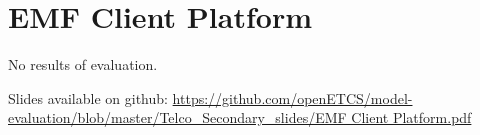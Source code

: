 \chapter{EMF Client Platform}
\label{sec:emfclientplatform}

No results of evaluation.

Slides available on github: \url{https://github.com/openETCS/model-evaluation/blob/master/Telco_Secondary_slides/EMF Client Platform.pdf}

